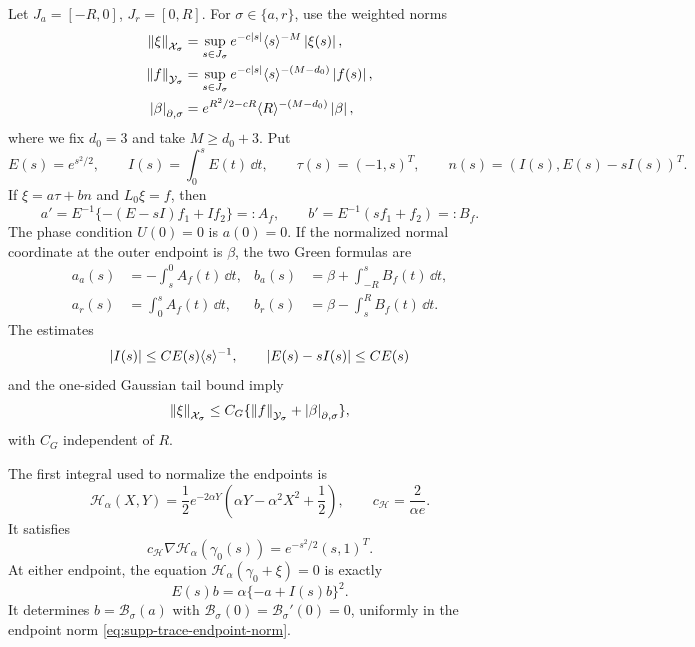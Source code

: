 Let \(J_a=[-R,0]\), \(J_r=[0,R]\).  For \(\sigma\in\{a,r\}\), use
the weighted norms
\begin{align}
 \left\lVert\xi\right\rVert_{\mathcal X_\sigma}
 &=\sup_{s\in J_\sigma}
 e^{-c\left\lvert s\right\rvert}\langle s\rangle^{-M}\left\lvert\xi(s)\right\rvert,
 \label{eq:supp-trace-state-norm}\\
 \left\lVert f\right\rVert_{\mathcal Y_\sigma}
 &=\sup_{s\in J_\sigma}
 e^{-c\left\lvert s\right\rvert}\langle s\rangle^{-(M-d_0)}\left\lvert f(s)\right\rvert,
 \label{eq:supp-trace-source-norm}\\
 \left\lvert\beta\right\rvert_{\partial,\sigma}
 &=e^{R^2/2-cR}\langle R\rangle^{-(M-d_0)}\left\lvert\beta\right\rvert,
 \label{eq:supp-trace-endpoint-norm}
\end{align}
where we fix \(d_0=3\) and take \(M\ge d_0+3\).  Put
\begin{equation}
 E(s)=e^{s^2/2},\qquad I(s)=\int_0^sE(t)\,\dd t,\qquad
 \tau(s)=(-1,s)^T,\qquad
 n(s)=(I(s),E(s)-sI(s))^T.
 \label{eq:supp-fold-fundamental-pair}
\end{equation}
If \(\xi=a\tau+bn\) and \(L_0\xi=f\), then
\begin{equation}
 a'=E^{-1}\{-(E-sI)f_1+If_2\}=:A_f,\qquad
 b'=E^{-1}(sf_1+f_2)=:B_f.
 \label{eq:supp-ab-equations}
\end{equation}
The phase condition \(U(0)=0\) is \(a(0)=0\).  If the normalized normal
coordinate at the outer endpoint is \(\beta\), the two Green formulas are
\begin{align}
 a_a(s)&=-\int_s^0A_f(t)\,\dd t,
 &b_a(s)&=\beta+\int_{-R}^sB_f(t)\,\dd t,
 \label{eq:supp-left-green}\\
 a_r(s)&=\int_0^sA_f(t)\,\dd t,
 &b_r(s)&=\beta-\int_s^RB_f(t)\,\dd t.
 \label{eq:supp-right-green}
\end{align}
The estimates
\begin{equation}
 \left\lvert I(s)\right\rvert\le CE(s)\langle s\rangle^{-1},\qquad
 \left\lvert E(s)-sI(s)\right\rvert\le CE(s)
 \label{eq:supp-I-estimates}
\end{equation}
and the one-sided Gaussian tail bound imply
\begin{equation}
 \left\lVert\xi\right\rVert_{\mathcal X_\sigma}
 \le C_G\{\left\lVert f\right\rVert_{\mathcal Y_\sigma}
                    +\left\lvert\beta\right\rvert_{\partial,\sigma}\},
 \label{eq:supp-one-sided-green-bound}
\end{equation}
with \(C_G\) independent of \(R\).

The first integral used to normalize the endpoints is
\begin{equation}
 \mathscr H_\alpha(X,Y)
 =\frac12e^{-2\alpha Y}
   \left(\alpha Y-\alpha^2X^2+\frac12\right),\qquad
 c_{\mathscr H}=\frac2{\alpha e}.
 \label{eq:supp-first-integral}
\end{equation}
It satisfies
\begin{equation}
 c_{\mathscr H}\nabla\mathscr H_\alpha(\gamma_0(s))
 =e^{-s^2/2}(s,1)^T.
 \label{eq:supp-first-integral-adjoint}
\end{equation}
At either endpoint, the equation
\(\mathscr H_\alpha(\gamma_0+\xi)=0\) is exactly
\begin{equation}
 E(s)b=\alpha\{-a+I(s)b\}^2.
 \label{eq:supp-endpoint-equation}
\end{equation}
It determines \(b=\mathcal B_\sigma(a)\) with
\(\mathcal B_\sigma(0)=\mathcal B_\sigma'(0)=0\), uniformly in the
endpoint norm \eqref{eq:supp-trace-endpoint-norm}.


